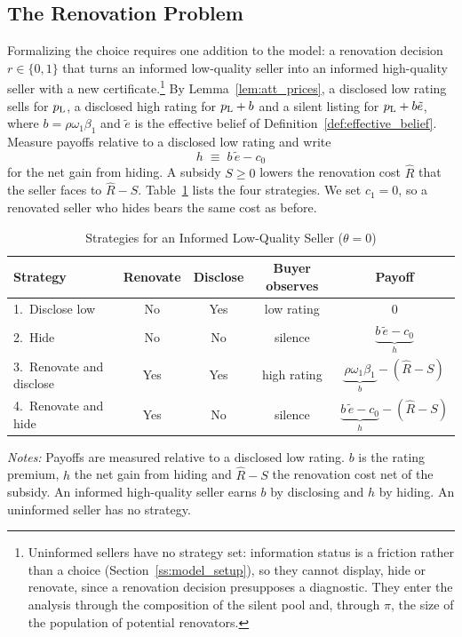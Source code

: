 \documentclass[10pt,letterpaper]{bp-template-concise}
\begin{document}
\subsection{The Renovation Problem}
\label{ss:renov_problem}

Formalizing the choice requires one addition to the model: a renovation decision $r\in\{0,1\}$ that turns an informed low-quality seller into an informed high-quality seller with a new certificate.\footnote{Uninformed sellers have no strategy set: information status is a friction rather than a choice (Section~\ref{ss:model_setup}), so they cannot display, hide or renovate, since a renovation decision presupposes a diagnostic. They enter the analysis through the composition of the silent pool and, through $\pi$, the size of the population of potential renovators.} By Lemma~\ref{lem:att_prices}, a disclosed low rating sells for $p_{\rm L}$, a disclosed high rating for $p_{\rm L}+b$ and a silent listing for $p_{\rm L}+b\tilde e$, where $b=\rho\omega_1\beta_1$ and $\tilde e$ is the effective belief of Definition~\ref{def:effective_belief}. Measure payoffs relative to a disclosed low rating and write
\[
    h\;\equiv\;b\,\tilde e-c_0
\]
for the net gain from hiding. A subsidy $S\ge0$ lowers the renovation cost $\hat R$ that the seller faces to $\hat R-S$. Table~\ref{tab:strategies} lists the four strategies. We set $c_1=0$, so a renovated seller who hides bears the same cost as before.

\begin{table}[htbp]
\centering
\caption{Strategies for an Informed Low-Quality Seller ($\theta=0$)}
\label{tab:strategies}
\small
\renewcommand{\arraystretch}{2.1}
\begin{tabular*}{\textwidth}{@{\extracolsep{\fill}}lcccc@{}}
\toprule\toprule
\textbf{Strategy} & \textbf{Renovate} & \textbf{Disclose} & \textbf{Buyer observes} & \textbf{Payoff} \\
\midrule
1.\ Disclose low & No & Yes & low rating & $0$ \\
2.\ Hide & No & No & silence & $\underbrace{b\,\tilde e-c_0}_{h}$ \\
3.\ Renovate and disclose & Yes & Yes & high rating & $\underbrace{\rho\omega_1\beta_1}_{b}-(\hat R-S)$ \\
4.\ Renovate and hide & Yes & No & silence & $\underbrace{b\,\tilde e-c_0}_{h}-(\hat R-S)$ \\
\bottomrule\bottomrule
\end{tabular*}
\vspace{0.5em}

\raggedright
\footnotesize
\textit{Notes:} Payoffs are measured relative to a disclosed low rating. $b$ is the rating premium, $h$ the net gain from hiding and $\hat R-S$ the renovation cost net of the subsidy. An informed high-quality seller earns $b$ by disclosing and $h$ by hiding. An uninformed seller has no strategy.
\end{table}
\end{document}
